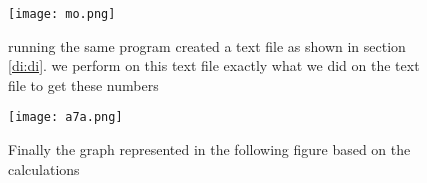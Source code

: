 \documentclass{article}
\begin{document}
\begin{figure}
\centering
\texttt{[image: mo.png]}
\caption{running the same program created a text file as shown in section  \ref{di:di}. we perform on this text file exactly what we did on the text file to get these numbers}
\label{fig:fig.png}
\end{figure}



\begin{figure}
\centering
\texttt{[image: a7a.png]}
\caption{Finally the graph represented in the following figure based on the calculations}
\label{fig:a7a.png}
\end{figure}
\end{document}
